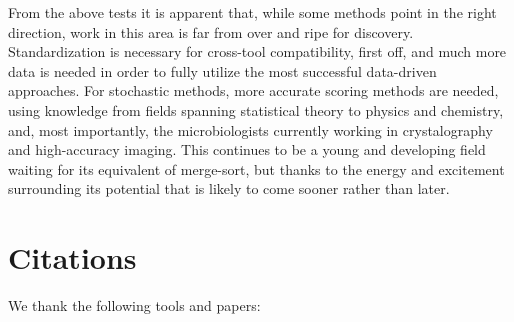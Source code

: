 \documentclass{article}
\begin{document}
From the above tests it is apparent that, while some methods point in the right direction, work in this area is far from over and ripe for discovery. Standardization is necessary for cross-tool compatibility, first off, and much more data is needed in order to fully utilize the most successful data-driven approaches. For stochastic methods, more accurate scoring methods are needed, using knowledge from fields spanning statistical theory to physics and chemistry, and, most importantly, the microbiologists currently working in crystalography and high-accuracy imaging. This continues to be a young and developing field waiting for its equivalent of merge-sort, but thanks to the energy and excitement surrounding its potential that is likely to come sooner rather than later.


\section{Citations}

We thank the following tools and papers: \\
\end{document}
